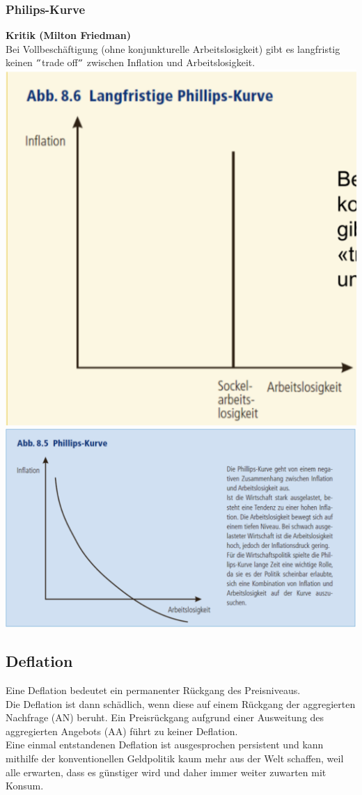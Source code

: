 \subsubsection{Philips-Kurve}
\begin{multicols}{2}
\textbf{Kritik (Milton Friedman)}\\
Bei Vollbeschäftigung (ohne konjunkturelle Arbeitslosigkeit) gibt es langfristig keinen $"$trade off$"$ zwischen Inflation und Arbeitslosigkeit.
\includegraphics[width=0.5\linewidth]{images/philipskurve2.png}
\vfill\null
\columnbreak
\includegraphics[width=\linewidth]{images/philipskurve.png}
\end{multicols}
\clearpage

\subsection{Deflation}
Eine Deflation bedeutet ein permanenter Rückgang des Preisniveaus.\\
Die Deflation ist dann schädlich, wenn diese auf einem Rückgang der aggregierten Nachfrage (AN) beruht. Ein Preisrückgang aufgrund einer Ausweitung des aggregierten Angebots (AA) führt zu keiner Deflation.\\
Eine einmal entstandenen Deflation ist ausgesprochen persistent und kann mithilfe der konventionellen Geldpolitik kaum mehr aus der Welt schaffen, weil alle erwarten, dass es günstiger wird und daher immer weiter zuwarten mit Konsum.


